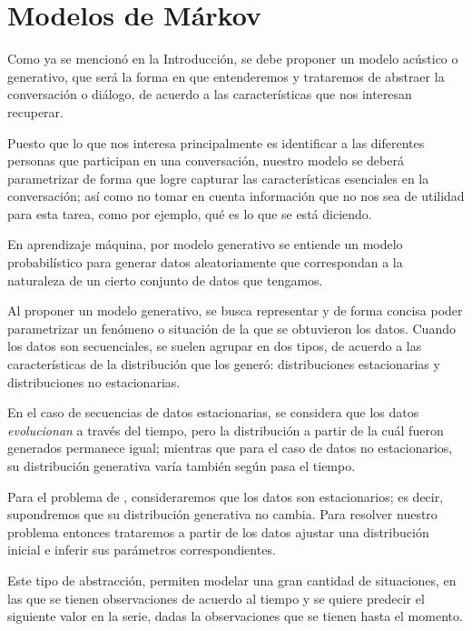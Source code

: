 
\chapter{Modelos de Márkov}\label{ch:chap2}


Como ya se mencionó en la Introducción, se debe proponer un modelo acústico o generativo, que será la forma en que entenderemos y trataremos de abstraer la conversación o diálogo, de acuerdo a las características que nos interesan recuperar.

Puesto que lo que nos interesa principalmente es identificar a las diferentes personas que participan en una conversación, nuestro modelo se deberá parametrizar de forma que logre capturar las características esenciales en la conversación; así como no tomar en cuenta información que no nos sea de utilidad para esta tarea, como por ejemplo, qué es lo que se está diciendo.

En aprendizaje máquina, por modelo generativo se entiende un modelo probabilístico para generar datos aleatoriamente que correspondan a la naturaleza de un cierto conjunto de datos que tengamos.

Al proponer un modelo generativo, se busca representar y de forma concisa poder parametrizar un fenómeno o situación de la que se obtuvieron los datos.
Cuando los datos son secuenciales, se suelen agrupar en dos tipos, de acuerdo a las características de la distribución que los generó: distribuciones estacionarias y distribuciones no estacionarias.

En el caso de secuencias de datos estacionarias, se considera que los datos \textit{evolucionan} a través del tiempo, pero la distribución a partir de la cuál fueron generados permanece igual; mientras que para el caso de datos no estacionarios, su distribución generativa varía también según pasa el tiempo.

Para el problema de \sd, consideraremos que los datos son estacionarios; es decir, supondremos que su distribución generativa no cambia. Para resolver nuestro problema entonces trataremos a partir de los datos ajustar una distribución inicial e inferir sus parámetros correspondientes.

Este tipo de abstracción, permiten modelar una gran cantidad de situaciones, en las que se tienen observaciones de acuerdo al tiempo y se quiere predecir el siguiente valor en la serie, dadas la observaciones que se tienen hasta el momento.

